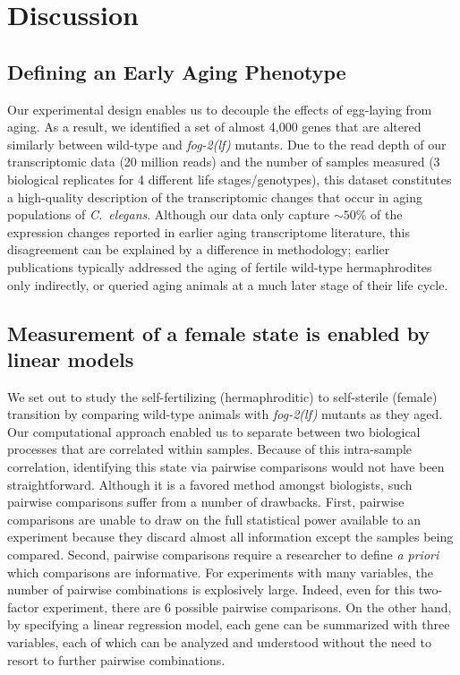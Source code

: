 \documentclass[9pt,twocolumn,twoside]{gsajnl}
\newcommand{\cel}{\emph{C.~elegans}}
\newcommand{\fog}{\emph{\mbox{fog-2(lf)}}}
\begin{document}
\section{Discussion}
\label{sec:discussion}

\subsection{Defining an Early Aging Phenotype}
\label{sub:Defining an Early Aging Phenotype}

Our experimental design enables us to decouple the effects of egg-laying from
aging. As a result, we identified a set of almost 4,000 genes that are altered
similarly between wild-type and \fog{} mutants. Due to the read depth of our
transcriptomic data (20 million reads) and the number of samples measured (3
biological replicates for 4 different life stages/genotypes), this dataset
constitutes a high-quality description of the transcriptomic changes that occur
in aging populations of \cel{}.
Although our data only capture $\sim50\%$ of the expression changes reported
in earlier aging transcriptome literature, this disagreement can be explained
by a difference in methodology; earlier publications typically addressed the
aging of fertile wild-type hermaphrodites only indirectly, or queried aging
animals at a much later stage of their life cycle.


\subsection{Measurement of a female state is enabled by linear models}
\label{sub:female_state}

We set out to study the self-fertilizing (hermaphroditic) to self-sterile
(female) transition by comparing wild-type animals with \fog{} mutants as they
aged. Our computational approach enabled us to separate between two biological
processes that are correlated within samples. Because of this intra-sample
correlation, identifying this state via pairwise comparisons would not have been
straightforward. Although it is a favored method amongst biologists, such
pairwise comparisons suffer from a number of drawbacks.
First, pairwise comparisons are unable to draw on the full statistical power
available to an experiment because they discard almost all information except
the samples being compared. Second, pairwise comparisons require a researcher
to define \emph{a priori} which comparisons are informative. For experiments
with many variables, the number of pairwise combinations is explosively large.
Indeed, even for this two-factor experiment, there are 6 possible pairwise
comparisons. On the other hand, by specifying a linear regression model, each
gene can be summarized with three variables, each of which can be analyzed and
understood without the need to resort to further pairwise combinations.
\end{document}
